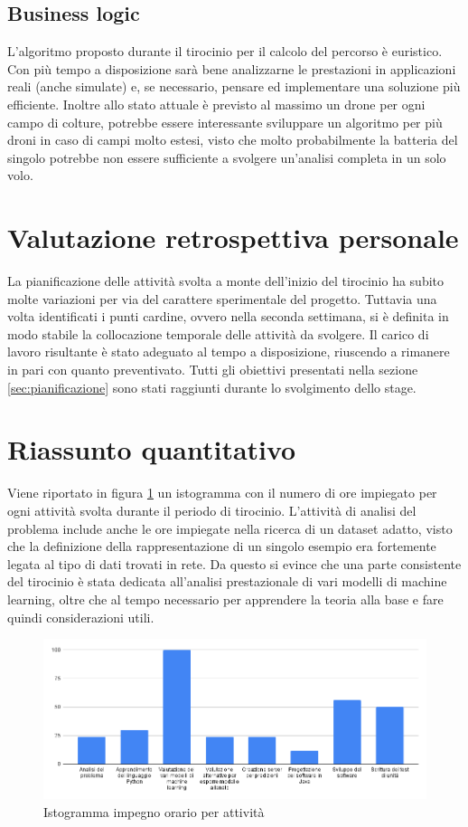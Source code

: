 \subsection{Business logic}
L'algoritmo proposto durante il tirocinio per il calcolo del percorso è euristico. Con più tempo a disposizione sarà bene analizzarne le prestazioni in applicazioni reali (anche simulate) e, se necessario, pensare ed implementare una soluzione più efficiente. Inoltre allo stato attuale è previsto al massimo un drone per ogni campo di colture, potrebbe essere interessante sviluppare un algoritmo per più droni in caso di campi molto estesi, visto che molto probabilmente la batteria del singolo potrebbe non essere sufficiente a svolgere un'analisi completa in un solo volo.

\section{Valutazione retrospettiva personale}
La pianificazione delle attività svolta a monte dell'inizio del tirocinio ha subito molte variazioni per via del carattere sperimentale del progetto. Tuttavia una volta identificati i punti cardine, ovvero nella seconda settimana, si è definita in modo stabile la collocazione temporale delle attività da svolgere. Il carico di lavoro risultante è stato adeguato al tempo a disposizione, riuscendo a rimanere in pari con quanto preventivato. Tutti gli obiettivi presentati nella sezione \ref{sec:pianificazione} sono stati raggiunti durante lo svolgimento dello stage.

\section{Riassunto quantitativo}
Viene riportato in figura \ref{fig:impegno_orario} un istogramma con il numero di ore impiegato per ogni attività svolta durante il periodo di tirocinio. L'attività di analisi del problema include anche le ore impiegate nella ricerca di un dataset adatto, visto che la definizione della rappresentazione di un singolo esempio era fortemente legata al tipo di dati trovati in rete. Da questo si evince che una parte consistente del tirocinio è stata dedicata all'analisi prestazionale di vari modelli di machine learning, oltre che al tempo necessario per apprendere la teoria alla base e fare quindi considerazioni utili.

\begin{figure}
    \centering
    \includegraphics[width=\textwidth]{immagini/impegno_orario.png}
    \caption{Istogramma impegno orario per attività}
    \label{fig:impegno_orario}
\end{figure}
